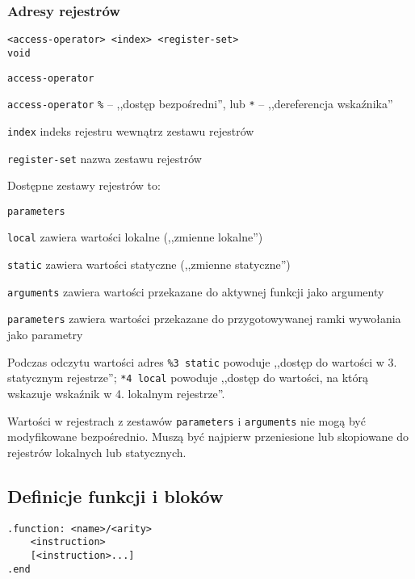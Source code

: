 \subsubsection{Adresy rejestrów}

\begin{lstlisting}
<access-operator> <index> <register-set>
void
\end{lstlisting}

\begin{labeling}{\texttt{access-operator}}
\item[\texttt{access-operator}] \texttt{\%} -- ,,dostęp bezpośredni'', lub
	\texttt{*} -- ,,dereferencja wskaźnika''
\item[\texttt{index}] indeks rejestru wewnątrz zestawu rejestrów
\item[\texttt{register-set}] nazwa zestawu rejestrów
\end{labeling}

Dostępne zestawy rejestrów to:

\begin{labeling}{\texttt{parameters}}
\item[\texttt{local}] zawiera wartości lokalne (,,zmienne lokalne'')
\item[\texttt{static}] zawiera wartości statyczne (,,zmienne statyczne'')
\item[\texttt{arguments}] zawiera wartości przekazane do aktywnej funkcji jako argumenty
\item[\texttt{parameters}] zawiera wartości przekazane do przygotowywanej ramki wywołania jako parametry
\end{labeling}

Podczas odczytu wartości adres \texttt{\%3 static} powoduje ,,dostęp do wartości w 3. statycznym rejestrze'';
\texttt{*4 local} powoduje ,,dostęp do wartości, na którą wskazuje wskaźnik w 4. lokalnym rejestrze''.

Wartości w rejestrach z zestawów \texttt{parameters} i \texttt{arguments} nie mogą być modyfikowane
bezpośrednio. Muszą być najpierw przeniesione lub skopiowane do rejestrów lokalnych lub statycznych.

\subsection{Definicje funkcji i bloków}

\begin{lstlisting}
.function: <name>/<arity>
	<instruction>
	[<instruction>...]
.end
\end{lstlisting}

